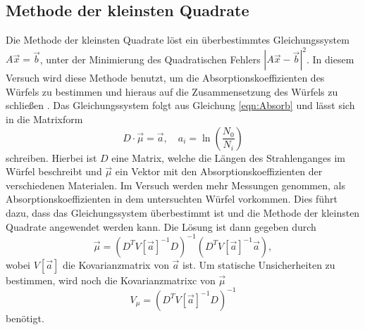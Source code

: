\subsection{Methode der kleinsten Quadrate}
Die Methode der kleinsten Quadrate löst ein überbestimmtes Gleichungssystem $A\vec{x} = \vec{b}$, unter der Minimierung des Quadratischen Fehlers $ |A\vec{x} -\vec{b}|^2$. In diesem Versuch wird diese Methode benutzt, um die Absorptionskoeffizienten des Würfels zu bestimmen und hieraus auf die Zusammensetzung des Würfels zu schließen . 
Das Gleichungssystem folgt aus Gleichung \ref{eqn:Absorb} und lässt sich in die Matrixform
\begin{equation*}
    D \cdot \vec{\mu} = \vec{a} , \quad a_i = \ln \left(\frac{N_0}{N_i} \right)
\end{equation*}
schreiben.
Hierbei ist $D$ eine Matrix, welche die Längen des Strahlenganges im Würfel beschreibt und $\vec{\mu}$ ein Vektor mit den Absorptionskoeffizienten der verschiedenen Materialen.
Im Versuch werden mehr Messungen genommen, als Absorptionskoeffizienten in dem untersuchten Würfel vorkommen. Dies führt dazu, dass das Gleichungssystem überbestimmt ist und die Methode der kleinsten Quadrate angewendet werden kann.
Die Lösung \cite{stat} ist dann gegeben durch 
\begin{equation}
    \label{eq:mu}
    \vec{\mu} = \left(D^T V[\vec{a}]^{-1} D \right)^{-1} \left( D^T V[\vec{a}]^{-1} \vec{a}\right),
\end{equation}
wobei $V[\vec{a}]$ die Kovarianzmatrix von $\vec{a}$ ist.
Um statische Unsicherheiten zu bestimmen, wird noch die Kovarianzmatrixc\cite{stat} von $\vec{\mu}$
\begin{equation*}
    V_{\mu} = \left(D^T V[\vec{a}]^{-1} D \right)^{-1}
\end{equation*}
benötigt.
